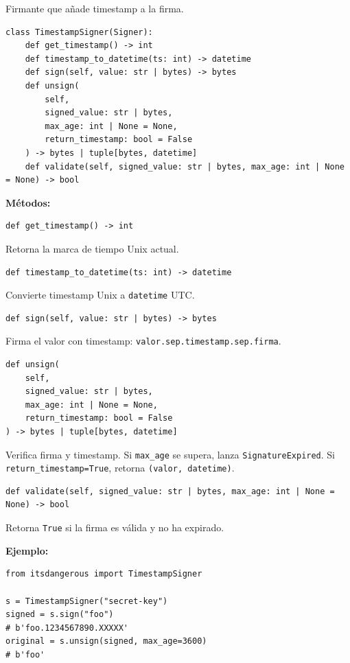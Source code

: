 \documentclass[11pt,a4paper]{article}
\begin{document}
Firmante que añade timestamp a la firma.


\begin{lstlisting}
class TimestampSigner(Signer):
    def get_timestamp() -> int
    def timestamp_to_datetime(ts: int) -> datetime
    def sign(self, value: str | bytes) -> bytes
    def unsign(
        self,
        signed_value: str | bytes,
        max_age: int | None = None,
        return_timestamp: bool = False
    ) -> bytes | tuple[bytes, datetime]
    def validate(self, signed_value: str | bytes, max_age: int | None = None) -> bool
\end{lstlisting}


\textbf{Métodos:}


\begin{lstlisting}
def get_timestamp() -> int
\end{lstlisting}


Retorna la marca de tiempo Unix actual.


\begin{lstlisting}
def timestamp_to_datetime(ts: int) -> datetime
\end{lstlisting}


Convierte timestamp Unix a \texttt{datetime} UTC.


\begin{lstlisting}
def sign(self, value: str | bytes) -> bytes
\end{lstlisting}


Firma el valor con timestamp: \texttt{valor.sep.timestamp.sep.firma}.


\begin{lstlisting}
def unsign(
    self,
    signed_value: str | bytes,
    max_age: int | None = None,
    return_timestamp: bool = False
) -> bytes | tuple[bytes, datetime]
\end{lstlisting}


Verifica firma y timestamp. Si \texttt{max\_age} se supera, lanza \texttt{SignatureExpired}. Si \texttt{return\_timestamp=True}, retorna \texttt{(valor, datetime)}.


\begin{lstlisting}
def validate(self, signed_value: str | bytes, max_age: int | None = None) -> bool
\end{lstlisting}


Retorna \texttt{True} si la firma es válida y no ha expirado.


\textbf{Ejemplo:}


\begin{lstlisting}
from itsdangerous import TimestampSigner

s = TimestampSigner("secret-key")
signed = s.sign("foo")
# b'foo.1234567890.XXXXX'
original = s.unsign(signed, max_age=3600)
# b'foo'
\end{lstlisting}
\end{document}
